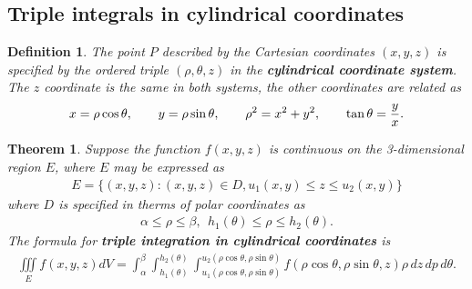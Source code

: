 \documentclass{article}
\theoremstyle{sltheorem}
\newtheorem{definition}{Definition}[section]
\newtheorem{theorem}{Theorem}[section]
\newcommand{\ti}{\iiint\limits}
\newcommand{\hs}{\hspace{0.7cm}}
\newcommand*\B[1]{\textbf{#1}}
\begin{document}
\subsection{Triple integrals in cylindrical coordinates}
\begin{definition}
    The point $P$ described by the Cartesian coordinates $(x,y,z)$ is specified by the
    ordered triple $(\rho,\theta,z)$ in the \B{cylindrical coordinate system}. The
    $z$ coordinate is the same in both systems, the other coordinates are related as
    \begin{align*}
        x=\rho\cos\theta,\hs y=\rho\sin\theta,\hs
        \rho^2 = x^2+y^2,\hs\tan\theta = \frac{y}{x}.
    \end{align*}
\end{definition}
\begin{theorem}
    Suppose the function $f(x,y,z)$ is continuous on the 3-dimensional region $E$, where $E$
    may be expressed as
    \begin{align*}
        E=\{(x,y,z) : (x,y,z) \in D, u_1(x,y) \leq z \leq u_2(x,y)\}
    \end{align*}
    where $D$ is specified in therms of polar coordinates as
    \begin{align*}
        \alpha \leq \rho \leq \beta,\:\: h_1(\theta) \leq \rho \leq h_2(\theta).
    \end{align*}
    The formula for \B{triple integration in cylindrical coordinates} is
    \begin{align*}
        \ti_E f(x,y,z) dV = \int_\alpha^\beta \int_{h_1(\theta)}^{h_2(\theta)}
        \int_{u_1(\rho\cos\theta,\rho\sin\theta)}^{u_2(\rho\cos\theta,\rho\sin\theta)}
        f(\rho\cos\theta,\rho\sin\theta,z)\rho\,dz\,dp\,d\theta.
    \end{align*}
\end{theorem}
\end{document}
